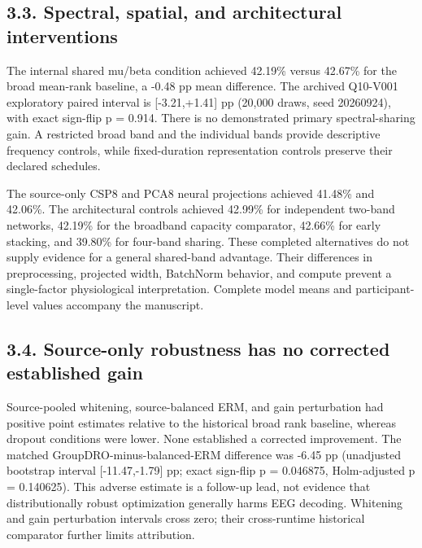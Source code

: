 \documentclass[11pt]{article}
\begin{document}
\subsection*{3.3. Spectral, spatial, and architectural interventions}
The internal shared mu/beta condition achieved 42.19\% versus 42.67\% for the broad mean-rank baseline, a -0.48 pp mean difference. The archived Q10-V001 exploratory paired interval is [-3.21,+1.41] pp (20,000 draws, seed 20260924), with exact sign-flip p = 0.914. There is no demonstrated primary spectral-sharing gain. A restricted broad band and the individual bands provide descriptive frequency controls, while fixed-duration representation controls preserve their declared schedules.

The source-only CSP8 and PCA8 neural projections achieved 41.48\% and 42.06\%. The architectural controls achieved 42.99\% for independent two-band networks, 42.19\% for the broadband capacity comparator, 42.66\% for early stacking, and 39.80\% for four-band sharing. These completed alternatives do not supply evidence for a general shared-band advantage. Their differences in preprocessing, projected width, BatchNorm behavior, and compute prevent a single-factor physiological interpretation. Complete model means and participant-level values accompany the manuscript.

\subsection*{3.4. Source-only robustness has no corrected established gain}
Source-pooled whitening, source-balanced ERM, and gain perturbation had positive point estimates relative to the historical broad rank baseline, whereas dropout conditions were lower. None established a corrected improvement. The matched GroupDRO-minus-balanced-ERM difference was -6.45 pp (unadjusted bootstrap interval [-11.47,-1.79] pp; exact sign-flip p = 0.046875, Holm-adjusted p = 0.140625). This adverse estimate is a follow-up lead, not evidence that distributionally robust optimization generally harms EEG decoding. Whitening and gain perturbation intervals cross zero; their cross-runtime historical comparator further limits attribution.
\end{document}
